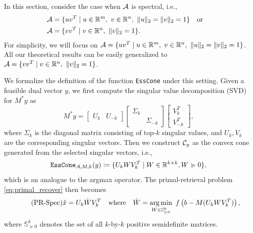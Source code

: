 In this section, consider the case when $\mathcal{A}$ is spectral, i.e.,
\begin{align*}
    \mathcal{A} &= \{uv^T \mid u \in \mathbb{R}^m,\ v \in \mathbb{R}^n,\ \|u\|_2=\|v\|_2 = 1\} \hbox{\quad or\quad} \\
    \mathcal{A} &= \{vv^T \mid v \in \mathbb{R}^n,\ \|v\|_2 = 1\}.
\end{align*}
For simplicity, we will focus on $\Ascr = \{uv^T \mid u \in \mR^m,\ v \in \mR^n,\ \|u\|_2=\|v\|_2 = 1\}$. All our theoretical results can be easily generalized to $\mathcal{A} = \{vv^T \mid v \in \mathbb{R}^n,\ \|v\|_2 = 1\}$.

We formalize the definition of the function \texttt{EssCone} under this setting. Given a feasible dual vector $y$, we first compute the singular value decomposition (SVD) for $M^*y$ as 
\[ M^*y = 
\begin{bmatrix}
    U_k & U_{-k}
\end{bmatrix}
\begin{bmatrix}
    \Sigma_k &          \\ 
             &  \Sigma_{-k}
\end{bmatrix}
\begin{bmatrix}
    V_k^T \\ 
    V_{-k}^T
\end{bmatrix},
\]
where $\Sigma_k$ is the diagonal matrix consisting of top-$k$ singular values, and $U_k, V_k$ are the corresponding singular vectors. Then we construct $\mathcal{C}_y$ as the convex cone generated from the selected singular vectors, i.e.,
\begin{equation} \label{eq:cone_spectral}
    \texttt{EssCone}_{\mathcal{A}, M, k}(y) \coloneqq \{U_kWV_k^T \mid W \in \mathbb{R}^{k\times k}, W \succcurlyeq 0\},
\end{equation}
which is an analogue to the argmax operator. The primal-retrieval problem \eqref{eq:primal_recover} then becomes
\begin{equation} \label{eq:primal_recover_spectral} \tag{PR-Spec}
\hat x = U_k\hat W V_k^T \hbox{\quad where\quad} \hat W = \underset{W \in \mathbb{S}^k_{\succeq 0}}{\textrm{arg}\,{\min}}\enskip f\left( b - M(U_k W V_k^T) \right),
\end{equation}
where $\mathbb{S}^k_{\succeq 0}$ denotes the set of all $k$-by-$k$ positive semidefinite matrices. 


